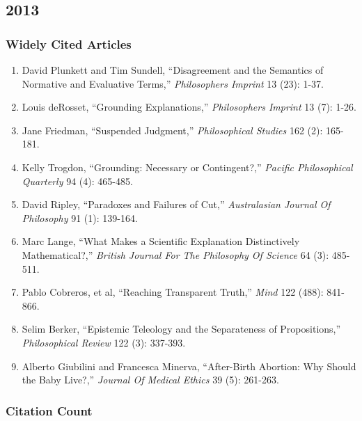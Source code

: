 \documentclass[
  10pt,
  letterpaper,
  DIV=11,
  numbers=noendperiod,
  twoside]{scrartcl}
\providecommand{\tightlist}{%
  \setlength{\itemsep}{0pt}\setlength{\parskip}{0pt}}\usepackage{longtable,booktabs,array}
\begin{document}
\newpage

\subsection{2013}\label{sec-s2013}

\subsubsection*{Widely Cited Articles}\label{widely-cited-articles-37}

\begin{enumerate}
\def\labelenumi{\arabic{enumi}.}
\tightlist
\item
  David Plunkett and Tim Sundell, ``Disagreement and the Semantics of
  Normative and Evaluative Terms,'' \emph{Philosophers Imprint} 13 (23):
  1-37.
\item
  Louis deRosset, ``Grounding Explanations,'' \emph{Philosophers
  Imprint} 13 (7): 1-26.
\item
  Jane Friedman, ``Suspended Judgment,'' \emph{Philosophical Studies}
  162 (2): 165-181.
\item
  Kelly Trogdon, ``Grounding: Necessary or Contingent?,'' \emph{Pacific
  Philosophical Quarterly} 94 (4): 465-485.
\item
  David Ripley, ``Paradoxes and Failures of Cut,'' \emph{Australasian
  Journal Of Philosophy} 91 (1): 139-164.
\item
  Marc Lange, ``What Makes a Scientific Explanation Distinctively
  Mathematical?,'' \emph{British Journal For The Philosophy Of Science}
  64 (3): 485-511.
\item
  Pablo Cobreros, et al, ``Reaching Transparent Truth,'' \emph{Mind} 122
  (488): 841-866.
\item
  Selim Berker, ``Epistemic Teleology and the Separateness of
  Propositions,'' \emph{Philosophical Review} 122 (3): 337-393.
\item
  Alberto Giubilini and Francesca Minerva, ``After-Birth Abortion: Why
  Should the Baby Live?,'' \emph{Journal Of Medical Ethics} 39 (5):
  261-263.
\end{enumerate}

\subsubsection*{Citation Count}\label{sec-count-2013}
\end{document}
